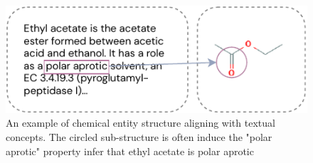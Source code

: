 





\begin{figure}
 	\vskip 0.2in
	\begin{center}
		\centerline{\includegraphics[width=0.9 
			\columnwidth]{intuition.pdf}}
		\caption{An example of chemical entity structure aligning with textual concepts. The circled sub-structure is
		often induce the "polar aprotic" property
		infer that ethyl acetate is polar aprotic}
		\label{fig:intuition}
	\end{center}
 	\vskip -0.2in
\end{figure}